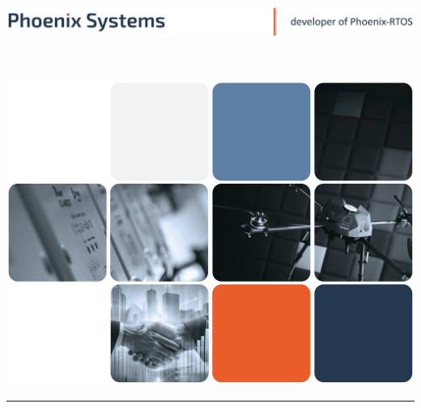%
%
%
%

\clearpage
\thispagestyle{empty}

\includegraphics[width=\textwidth]{page_header.png}

\vspace{2.0cm}

{\setmainfont{Liberation Sans}
\textcolor{ps-darkblue}{%
	{\fontsize{30}{36}\selectfont \textbf{\doctitle}\\}
}}

\vspace{0.4cm}

{\setmainfont{Liberation Sans}
\textcolor{ps-darkblue}{%
	{\fontsize{16}{19}\selectfont \textbf{\docauthor}}
}}

\vspace{2.25cm}

\begin{flushright}
	\includegraphics[width=1.0\textwidth]{titlepage_image.png}
\end{flushright}

\vspace{\fill}

\begin{center}
	\color{ps-orange}\rule{\textwidth}{2pt}
\end{center}

\vspace{0.15cm}

{\setmainfont{Liberation Sans}
\fontsize{10}{12}\selectfont
\textcolor{ps-lightblue}{%
	\makebox[\textwidth][l]{\hspace{0.2cm}\docversion\hfill \docdate\hspace{0.2cm}}
}}
\clearpage
\pagestyle{plain}
